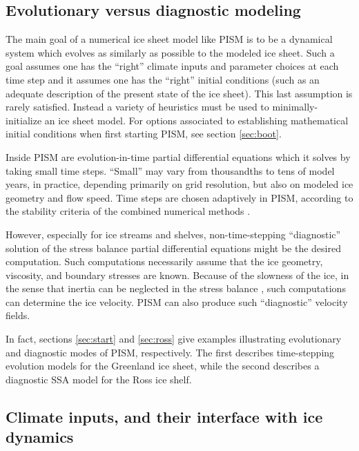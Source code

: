 \subsection{Evolutionary versus diagnostic modeling} \label{subsect:basicmodes}    The main goal of a numerical ice sheet model like PISM is to be a dynamical system which evolves as similarly as possible to the modeled ice sheet.  Such a goal assumes one has the ``right'' climate inputs and parameter choices at each time step and it assumes one has the ``right'' initial conditions (such as an adequate description of the present state of the ice sheet).  This last assumption is rarely satisfied.  Instead a variety of heuristics must be used to minimally-initialize an ice sheet model.  For options associated to establishing mathematical initial conditions when first starting PISM, see section \ref{sec:boot}.

Inside PISM are evolution-in-time partial differential equations which it solves by taking small time steps.  ``Small'' may vary from thousandths to tens of model years, in practice, depending primarily on grid resolution, but also on modeled ice geometry and flow speed.  Time steps are chosen adaptively in PISM, according to the stability criteria of the combined numerical methods \cite{BBssasliding,BBL}.

However, especially for ice streams and shelves, non-time-stepping ``diagnostic'' solution of the stress balance partial differential equations might be the desired computation.  Such computations necessarily assume that the ice geometry, viscosity, and boundary stresses are known.  Because of the slowness of the ice, in the sense that inertia can be neglected in the stress balance \cite{Fowler}, such computations can determine the ice velocity.  PISM can also produce such ``diagnostic'' velocity fields.

In fact, sections \ref{sec:start} and \ref{sec:ross} give examples illustrating evolutionary and diagnostic modes of PISM, respectively.  The first describes time-stepping evolution models for the Greenland ice sheet, while the second describes a diagnostic SSA model for the Ross ice shelf.


\subsection{Climate inputs, and their interface with ice dynamics}
\label{sec:climate-inputs}  

